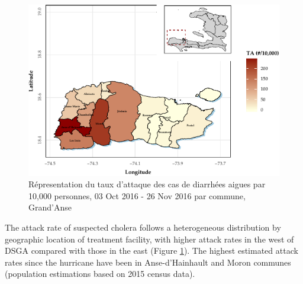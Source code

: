 \documentclass[]{tufte-handout}
\begin{document}
\clearpage

\begin{figure}
\includegraphics{rapport_final_files/figure-latex/map-1} \caption[Répresentation du taux d'attaque des cas de diarrhées aigues par 10,000 personnes, 03 Oct 2016 - 26 Nov 2016 par commune, Grand’Anse]{Répresentation du taux d'attaque des cas de diarrhées aigues par 10,000 personnes, 03 Oct 2016 - 26 Nov 2016 par commune, Grand’Anse}\label{fig:map}
\end{figure}

The attack rate of suspected cholera follows a heterogeneous
distribution by geographic location of treatment facility, with higher
attack rates in the west of DSGA compared with those in the east (Figure
\ref{fig:map}). The highest estimated attack rates since the hurricane
have been in Anse-d'Hainhault and Moron communes (population estimations
based on 2015 census data).

\clearpage
\end{document}
